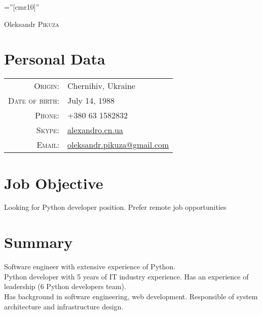 \documentclass[a4paper,10pt]{article}
\begin{document}
\pagestyle{empty} %

\font\fb=''[cmr10]'' %

\par{\centering
  {\Huge Oleksandr \textsc{Pikuza}
}\bigskip\par}

\section{Personal Data}

\begin{tabular}{rl}
    \textsc{Origin:}   	& Chernihiv, Ukraine \\
    \textsc{Date of birth:}    & July 14, 1988 \\
    \textsc{Phone:}     & +380 63 1582832 \\
    \textsc{Skype:}	& \href{skype:alexandro.cn.ua}{alexandro.cn.ua} \\
    \textsc{Email:}     & \href{mailto:oleksandr.pikuza@gmail.com}{oleksandr.pikuza@gmail.com} \\
\end{tabular}

\section{Job Objective}
Looking for Python developer position. Prefer remote job opportunities

\section{Summary}
Software engineer with extensive experience of Python.\\ 
Python developer with 5 years of IT industry experience. Has an experience of leadership (6 Python developers team). \\
Has background in software engineering, web development. Responsible of system architecture and infrastructure design.

\end{document}
